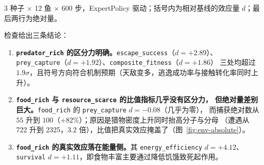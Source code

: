 \begin{table}[H]
  \centering
  \caption{环境对照的前置区分力检查。}
  \label{tab:env-power}
  \footnotesize
\setlength{\tabcolsep}{1pt}
  \begin{threeparttable}
  \begin{tablenotes}\footnotesize\raggedright
    \item 3 种子 $\times$ 12 鱼 $\times$ 600 步，ExpertPolicy 驱动；括号内为相对基线的效应量 $d$；最后两行为绝对量。
  \end{tablenotes}
  \end{threeparttable}
\end{table}

检查给出三条结论：

\begin{enumerate}
  \item \textbf{\texttt{predator\_rich} 的区分力明确。}\texttt{escape\_success}（$d=+2.89$）、
        \texttt{prey\_capture}（$d=+1.92$）、\texttt{composite\_fitness}（$d=+1.86$）
        三处均超过 $1.9\sigma$，且符号方向符合机制预期（天敌变多，逃逸成功率与接触转化率同时上升）。
  \item \textbf{\texttt{food\_rich} 与 \texttt{resource\_scarce} 的比值指标几乎没有区分力，
        但绝对量差别巨大。}\texttt{food\_rich} 的 \texttt{prey\_capture} $d=-0.08$（几乎为零），
        而捕获绝对数从 $55$ 升到 $100$（$+82\%$）；原因是猎物密度上升同时抬高分子与分母
        （遭遇从 722 升到 2325，$3.2$ 倍），比值把真实效应掩盖了（图~\ref{fig:env-absolute}）。
  \item \textbf{\texttt{food\_rich} 的真实效应落在能量侧。}其 \texttt{energy\_efficiency} $d=+4.12$、
        \texttt{survival} $d=+1.11$，即食物丰富主要通过降低饥饿致死起作用。
\end{enumerate}

